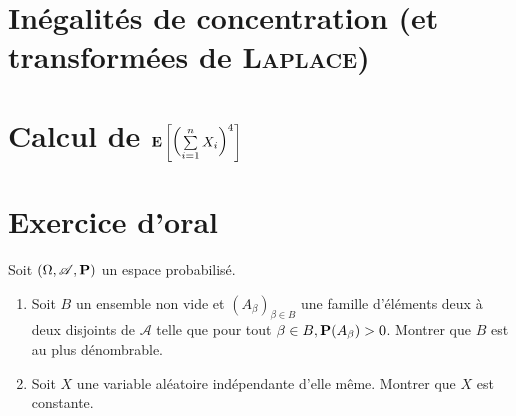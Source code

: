 \section{Inégalités de concentration (et transformées de \textsc{Laplace})}


\section{Calcul de \texorpdfstring{$\E \left [ \left (\sum\limits_{i=1}^{n} X_i \right)^4 \right]$}{espérance de la somme puissance 4 de v.a.}}


\section{Exercice d'oral}
\cite{acamanes}
\begin{exercice}
    Soit $(\Omega, \mathscr{A}, \P)$ un espace probabilisé. 
    \begin{enumerate}
        \item Soit $B$ un ensemble non vide et $(A_{\beta})_{\beta \in B}$ une famille d'éléments deux à deux disjoints de $\mathscr{A}$ telle que pour tout $\beta \in B, \P(A_\beta) > 0$. Montrer que $B$ est au plus dénombrable. 
        \item Soit $X$ une variable aléatoire indépendante d'elle même. Montrer que $X$ est constante. 
    \end{enumerate}
\end{exercice} 


